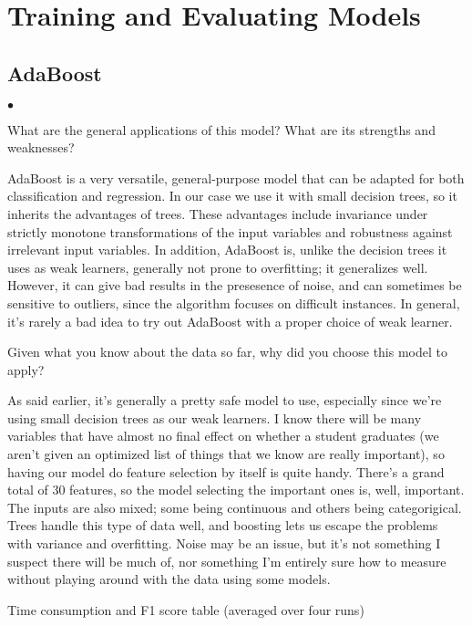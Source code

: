 \documentclass{amsart}
\begin{document}
\section{Training and Evaluating Models}
\subsection{AdaBoost}
\begin{list}{$\bullet$}{\addtolength{\parsep}{1mm}}
	\item What are the general applications of this model?  What are its strengths and weaknesses?

	AdaBoost is a very versatile, general-purpose model that can be adapted for both classification and regression.  In our case we use it with small decision trees, so it inherits
	the advantages of trees.   These advantages include invariance under strictly monotone transformations of the input variables and robustness against irrelevant
	input variables.  In addition, AdaBoost is, unlike the decision trees it uses as weak learners, generally not prone to overfitting; it generalizes well.
	However, it can give bad results in the presesence of noise, and can sometimes be sensitive to outliers, since the algorithm focuses on difficult instances.  
	In general, it's rarely a bad idea to try out AdaBoost with a proper choice of weak learner.

	\item Given what you know about the data so far, why did you choose this model to apply?
	
	As said earlier, it's generally a pretty safe model to use, especially
	since we're using small decision trees as our weak learners.  I know there will be many variables that have almost no final effect on whether a student graduates (we aren't
	given an optimized list of things that we know are really important), so having our model do feature selection by itself is quite handy.  There's a grand total of 30 features,
	so the model selecting the important ones is, well, important.  The inputs are also mixed; some being continuous and others being categorigical.  Trees handle this type of
	data well, and boosting lets us escape the problems with variance and overfitting.  Noise may be an issue, but it's not something I suspect there will be much of, nor something
	I'm entirely sure how to measure without playing around with the data using some models.

	\item Time consumption and F1 score table (averaged over four runs)


\end{list}
\end{document}
